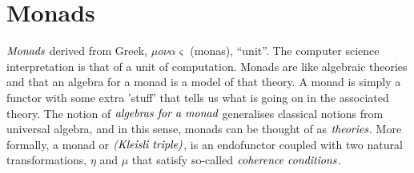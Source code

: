 \documentclass[10pt, oneside, reqno]{amsart}
\theoremstyle{plain}%
\theoremstyle{definition}
\newtheorem{defn}[thm]{Definition}
\newtheorem{exmp}[thm]{Example}
\theoremstyle{remark}
\begin{document}
% 


\section{Monads} %
\label{sec:monads}
$\emph{Monads}$ derived from Greek, $\mu o \nu\alpha\varsigma$ (monas), ``unit''.
The computer science interpretation is that of a unit of computation.
Monads are like algebraic theories and that an algebra for a monad is a model of that theory. A monad is simply
a functor with some extra 'stuff' that tells us what is going on in the associated theory.
The notion of $\emph{algebras for a monad}$ generalises classical notions from universal algebra,
and in this sense, monads can be thought of as $\emph{theories}$.
More formally, a monad or $\emph{(Kleisli triple)}$, is an endofunctor coupled with two natural transformations,
$\eta$ and $\mu$ that satisfy so-called $\emph{coherence conditions}$.
\end{document}
